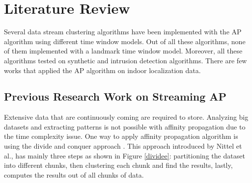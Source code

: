 \documentclass[../UNBThesis2.tex]{subfiles}
\begin{document}
\chapter{Literature Review}
Several data stream clustering algorithms have been implemented with the AP algorithm using different time window models. Out of all these algorithms, none of them implemented with a landmark time window model. Moreover, all these algorithms tested on synthetic and intrusion detection algorithms. There are few works that applied the AP algorithm on indoor localization data.







\section{Previous Research Work on Streaming AP }
Extensive data that are continuously coming are required to store. Analyzing big datasets and extracting patterns is not possible with affinity propagation due to the time complexity issue.
One way to apply affinity propagation algorithm is using the divide and conquer approach \cite{khalilian2016data}. This approach introduced by Nittel et al.\cite{nittel2004scaling}, has mainly three steps as shown in Figure \ref{dividee}: partitioning the dataset into different chunks, then clustering each chunk and find the results, lastly, computes the results out of all chunks of data. 
\end{document}
